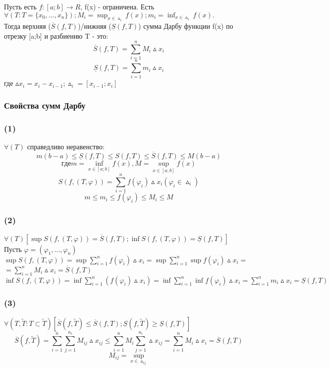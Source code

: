 \begin{opred}
Пусть есть $f:[a;b] \to R$, f(x) - ограничена.
Есть $\forall(T:T=\{x_0,...,x_n\}); M_i=\sup_{x\in\vartriangle_i}f(x); m_i=\inf_{x\in\vartriangle_i}f(x).$
\\
Тогда верхняя ($\overline{S}(f,T)$)/нижняя ($\underline{S}(f,T)$) сумма Дарбу функции f(x) по отрезку [a;b] и разбиению T - это:
$$
\overline{S}(f,T)=\sum_{i=1}^{n}M_i \vartriangle x_i
$$
$$
\underline{S}(f,T)=\sum_{i=1}^{n}m_i \vartriangle x_i
$$
где $\vartriangle x_i = x_i - x_{i-1}; \vartriangle_i=[x_{i-1};x_i]$
\end{opred}

\subsubsection{Свойства сумм Дарбу}
\subsubsection{(1)}
$\forall(T)$ справедливо неравенство:
$$
m(b-a) \leq \underline{S}(f,T)\leq S(f,T)\leq \overline{S}(f,T) \leq M(b-a)
$$
$$ где m=\inf_{x \in [a;b]}f(x), M=\sup_{x\in[a;b]}f(x)$$
$$S(f,(T,\varphi))=\sum_{i=1}^{n}f(\varphi_i)\vartriangle x_i  (\varphi_i \in \vartriangle_i)$$
$$m\leq m_i\leq f(\varphi_i)\leq M_i\leq M$$
\subsubsection{(2)}
$\forall(T)[\sup S(f,(T,\varphi))=\overline{S}(f,T);\inf S(f,(T,\varphi))=\underline{S}(f,T)]$
\\
\dokvo
Пусть $\varphi=(\varphi_1,...,\varphi_n)$
\\
$\sup S(f,(T,\varphi))=\sup \sum_{i=1}^{n}f(\varphi_i)\vartriangle x_i=\sup \sum_{i=1}^{n}\sup f(\varphi_i)\vartriangle x_i=$
\\
$=\sum_{i=1}^{n}M_i\vartriangle x_i = \overline{S}(f,T)$
\\
$\inf S(f,(T,\varphi))=\inf\sum_{i=1}^{n}(f(\varphi_i)\vartriangle x_i)=\inf\sum_{i=1}^{n}\inf f(\varphi_i)\vartriangle x_i = \sum_{i=1}^{n}m_i\vartriangle x_i = \underline{S}(f,T)$
\subsubsection{(3)}
$\forall(T,\tilde{T}:T\subset\tilde{T})[\overline{S}(f,\tilde{T})\leq \overline{S}(f,T); \underline{S}(f,\tilde{T})\geq \underline{S}(f,T)]$
\dokvo
$$\overline{S}(f,\tilde{T})=\sum_{i=1}^{n}\sum_{j=1}^{n_i}M_{ij}\vartriangle x_{ij} \leq \sum_{i=1}^{n}M_i\sum_{j=1}^{n_i}\vartriangle x_{ij}= \sum_{i=1}^{n}M_i\vartriangle x_i = \overline{S}(f,T)
$$
$$
M_{ij}=\sup_{x\in \vartriangle_{ij}}
$$

